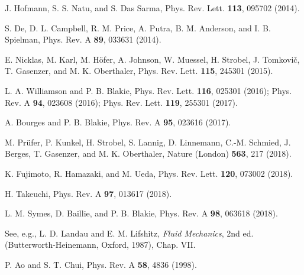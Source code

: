 \documentclass[pra,aps,superscriptaddress,twocolumn]{revtex4-2}
\begin{document}
\begin{thebibliography}{99}
J. Hofmann, S. S. Natu, and S. Das Sarma,
Phys. Rev. Lett. \textbf{113}, 095702 (2014).

S. De, D. L. Campbell, R. M. Price, A. Putra, B. M. Anderson, and
I. B. Spielman,
Phys. Rev. A \textbf{89}, 033631 (2014).

E. Nicklas, M. Karl, M. H\"ofer, A. Johnson, W. Muessel, H. Strobel,
J. Tomkovi\v{c}, T. Gasenzer, and M. K. Oberthaler,
Phys. Rev. Lett. \textbf{115}, 245301 (2015).

L. A. Williamson and P. B. Blakie,
Phys. Rev. Lett. \textbf{116}, 025301 (2016);
Phys. Rev. A \textbf{94}, 023608 (2016);
Phys. Rev. Lett. \textbf{119}, 255301 (2017).

A. Bourges and P. B. Blakie,
Phys. Rev. A \textbf{95}, 023616 (2017).

M. Pr\"ufer, P. Kunkel, H. Strobel, S. Lannig, D. Linnemann, C.-M. Schmied,
J. Berges, T. Gasenzer, and M. K. Oberthaler,
Nature (London) \textbf{563}, 217 (2018).

K. Fujimoto, R. Hamazaki, and M. Ueda,
Phys. Rev. Lett. \textbf{120}, 073002 (2018).

H. Takeuchi,
Phys. Rev. A \textbf{97}, 013617 (2018).

L. M. Symes, D. Baillie, and P. B. Blakie,
Phys. Rev. A \textbf{98}, 063618 (2018).

See, e.g., L. D. Landau and E. M. Lifshitz, {\it Fluid Mechanics}, 2nd ed.
(Butterworth-Heinemann, Oxford, 1987), Chap. VII.

P. Ao and S. T. Chui,
Phys. Rev. A \textbf{58}, 4836 (1998).


\end{thebibliography}
\end{document}
